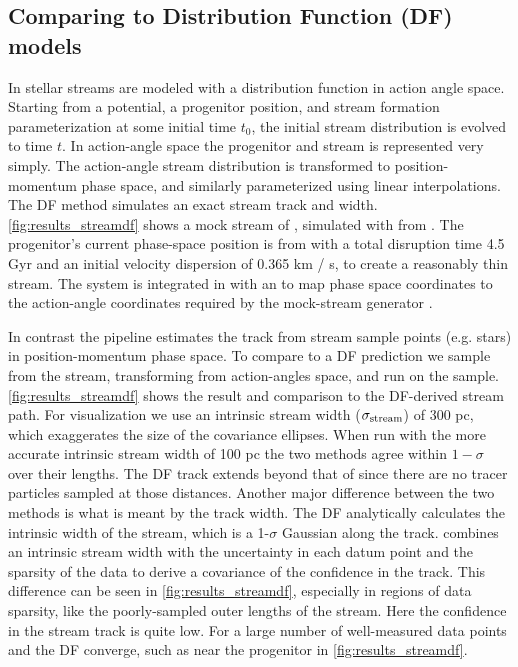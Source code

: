 \documentclass[fleqn,usenatbib]{mnras}
\begin{document}
  \subsection{Comparing to Distribution Function (DF) models}
  \label{sub:comparing_to_distribution_function_df_models}

    In \citet{Bovy2014} stellar streams are modeled with a distribution function
    in action angle space. Starting from a potential, a progenitor position, and
    stream formation parameterization at some initial time $t_0$, the initial
    stream distribution is evolved to time $t$. In action-angle space the
    progenitor and stream is represented very simply. The action-angle stream
    distribution is transformed to position-momentum phase space, and similarly
    parameterized using linear interpolations. The DF method simulates an exact
    stream track and width. \autoref{fig:results_streamdf} shows a mock stream
    of , simulated with \galpystreamdf{} from \citet{Bovy2014}.
    The progenitor's current phase-space position is from \citet{Vasiliev2019}
    with a total disruption time 4.5 Gyr and an initial velocity dispersion of
    0.365 km / s, to create a reasonably thin stream. The system is integrated
    in \galpyMWPotential{} with an
     to map
    phase space coordinates to the action-angle coordinates required by the
    mock-stream generator \citep{Bovy2015}.

    In contrast the \trackstream{} pipeline estimates the track from stream
    sample points (e.g. stars) in position-momentum phase space. To compare
    \trackstream{} to a DF prediction we sample from the stream, transforming
    from action-angles space, and run \trackstream{} on the sample.
    \autoref{fig:results_streamdf} shows the result and comparison to the
    DF-derived stream path. For visualization we use an intrinsic stream width
    ($\sigma_{\rm{stream}}$) of 300 pc, which exaggerates the size of the
    covariance ellipses. When run with the more accurate intrinsic stream width
    of 100 pc the two methods agree within $1-\sigma$ over their lengths. The DF
    track extends beyond that of \trackstream{} since there are no tracer
    particles sampled at those distances. Another major difference between the
    two methods is what is meant by the track width. The DF analytically
    calculates the intrinsic width of the stream, which is a 1-$\sigma$ Gaussian
    along the track. \trackstream{} combines an intrinsic stream width with the
    uncertainty in each datum point and the sparsity of the data to derive a
    covariance of the confidence in the track. This difference can be seen in
    \autoref{fig:results_streamdf}, especially in regions of data sparsity, like
    the poorly-sampled outer lengths of the stream. Here the confidence in the
    stream track is quite low. For a large number of well-measured data points
    \trackstream{} and the DF converge, such as near the progenitor in
    \autoref{fig:results_streamdf}.
\end{document}
